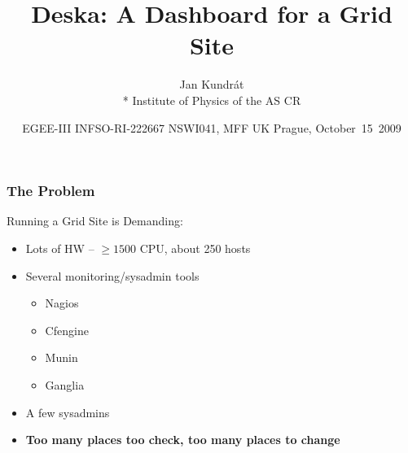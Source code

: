 \documentclass{beamer}
\begin{document}
\title{Deska: A Dashboard for a Grid Site}
\author{Jan Kundrát\\*
Institute of Physics of the AS CR}
\date{
   {EGEE-III INFSO-RI-222667}  
\hfill
NSWI041, MFF UK Prague, October~15~2009
}
\begin{frame}
\maketitle
\end{frame}


\begin{frame}[fragile]
\frametitle{The Problem}

Running a Grid Site is Demanding:

\begin{itemize}
    \item Lots of HW -- $\ge 1500$ CPU, about 250 hosts
    \item Several monitoring/sysadmin tools
        \begin{itemize}
            \item Nagios
            \item Cfengine
            \item Munin
            \item Ganglia
        \end{itemize}
    \item A few sysadmins
    \item \bf{Too many places too check, too many places to change}
\end{itemize}
\end{frame}
\end{document}
